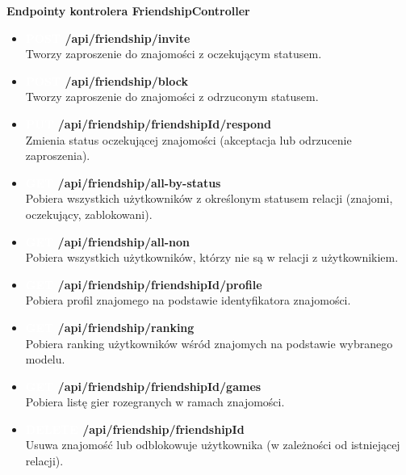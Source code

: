 \documentclass[12pt,a4paper]{article}
\begin{document}
\textbf{Endpointy kontrolera FriendshipController}
\begin{itemize} 
    \item \textbf{\colorbox{green!90}{\textcolor{white}{POST}} /api/friendship/invite} \\
    Tworzy zaproszenie do znajomości z oczekującym statusem. 
    \item \textbf{\colorbox{green!90}{\textcolor{white}{POST}} /api/friendship/block} \\
    Tworzy zaproszenie do znajomości z odrzuconym statusem. 
    \item \textbf{\colorbox{orange!90}{\textcolor{white}{PUT}} /api/friendship/{friendshipId}/respond} \\
    Zmienia status oczekującej znajomości (akceptacja lub odrzucenie zaproszenia). 
    \item \textbf{\colorbox{cyan!90}{\textcolor{white}{GET}} /api/friendship/all-by-status} \\
    Pobiera wszystkich użytkowników z określonym statusem relacji (znajomi, oczekujący, zablokowani). 
    \item \textbf{\colorbox{cyan!90}{\textcolor{white}{GET}} /api/friendship/all-non} \\
    Pobiera wszystkich użytkowników, którzy nie są w relacji z użytkownikiem. 
    \item \textbf{\colorbox{cyan!90}{\textcolor{white}{GET}} /api/friendship/{friendshipId}/profile} \\
    Pobiera profil znajomego na podstawie identyfikatora znajomości. 
    \item \textbf{\colorbox{cyan!90}{\textcolor{white}{GET}} /api/friendship/ranking} \\
    Pobiera ranking użytkowników wśród znajomych na podstawie wybranego modelu. 
    \item \textbf{\colorbox{cyan!90}{\textcolor{white}{GET}} /api/friendship/{friendshipId}/games} \\
    Pobiera listę gier rozegranych w ramach znajomości. 
    \item \textbf{\colorbox{red!90}{\textcolor{white}{DELETE}} /api/friendship/{friendshipId}} \\
    Usuwa znajomość lub odblokowuje użytkownika (w zależności od istniejącej relacji). 
\end{itemize}

\newpage
\end{document}

